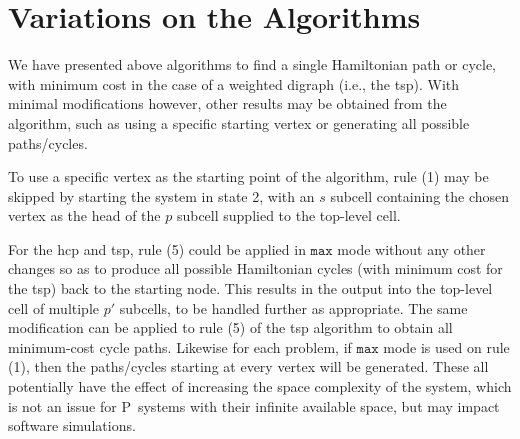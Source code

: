 \section{\label{sec:tsp:variations}Variations on the Algorithms}
We have presented above algorithms to find a single Hamiltonian path or cycle, with minimum cost in the case of a weighted digraph (i.e., the \gls{tsp}).  With minimal modifications however, other results may be obtained from the algorithm, such as using a specific starting vertex or generating all possible paths/cycles.

To use a specific vertex as the starting point of the algorithm, rule (1) may be skipped by starting the system in state 2, with an \(s\) subcell containing the chosen vertex as the head of the \(p\) subcell supplied to the top-level cell.

For the \gls{hcp} and \gls{tsp}, rule (5) could be applied in \(\mathtt{max}\) mode without any other changes so as to produce all possible Hamiltonian cycles (with minimum cost for the \gls{tsp}) back to the starting node.  This results in the output into the top-level cell of multiple \(p'\) subcells, to be handled further as appropriate.  The same modification can be applied to rule (5) of the \gls{tsp} algorithm to obtain all minimum-cost cycle paths.  Likewise for each problem, if \(\mathtt{max}\) mode is used on rule (1), then the paths/cycles starting at every vertex will be generated.  These all potentially have the effect of increasing the space complexity of the system, which is not an issue for P~systems with their infinite available space, but may impact software simulations.



